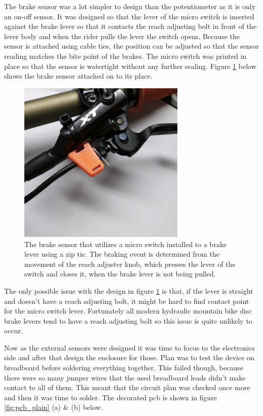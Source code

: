 \documentclass[a4paper,11pt]{article}
\begin{document}
The brake sensor was a lot simpler to design than the potentiometer as it is only an on-off sensor. It was designed so that the lever of the micro switch is inserted against the brake lever so that it contacts the reach adjusting bolt in front of the lever body and when the rider pulls the lever the switch opens. Because the sensor is attached using cable ties, the position can be adjusted so that the sensor reading matches the bite point of the brakes. The micro switch was printed in place so that the sensor is watertight without any further sealing. Figure \ref{fig:brake_sensor} below shows the brake sensor attached on to its place.

\begin{figure}[H]
    \centering
    \includegraphics[width=80mm]{Figures/brake_sensor_1.jpg}
    \caption{The brake sensor that utilizes a micro switch installed to a brake lever using a zip tie. The braking event is determined from the movement of the reach adjuster knob, which presses the lever of the switch and closes it, when the brake lever is not being pulled.}
    \label{fig:brake_sensor}
\end{figure}

The only possible issue with the design in figure \ref{fig:brake_sensor} is that, if the lever is straight and doesn't have a reach adjusting bolt, it might be hard to find contact point for the micro switch lever. Fortunately all modern hydraulic mountain bike disc brake levers tend to have a reach adjusting bolt so this issue is quite unlikely to occur.

Now as the external sensors were designed it was time to focus to the electronics side and after that design the enclosure for those. Plan was to test the device on breadboard before soldering everything together. This failed though, because there were so many jumper wires that the used breadboard leads didn't make contact to all of them. This meant that the circuit plan was checked once more and then it was time to solder. The decorated pcb is shown in figure \ref{fig:pcb_plain} (a) \& (b) below.
\end{document}
